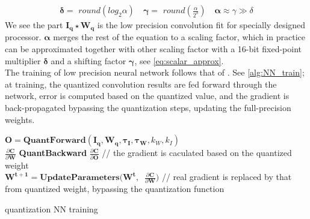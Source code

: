 \begin{equation}
    \begin{aligned}\label{eq:scalar_approx}
        \boldsymbol{\delta}=\textit{ round} ( log_2\alpha)\quad
        \boldsymbol{\gamma}=\textit{ round}( \frac{\alpha}{2^{\delta}})\quad
        \boldsymbol{\alpha}\approx\gamma\gg\delta
    \end{aligned}    
\end{equation}
We see the part $\boldsymbol{I_q}\star\boldsymbol{W_q}$ is the low precision convolution fit for specially designed processor. $\boldsymbol{\alpha}$ merges the rest of the equation to a scaling factor, which in practice can be approximated together with other scaling factor with a 16-bit fixed-point multiplier $\boldsymbol{\delta}$ and a shifting factor $\boldsymbol{\gamma}$, see \autoref{eq:scalar_approx}. \\
The training of low precision neural network follows that of \cite{XnorNet}. See \autoref{alg:NN_train}; at training, the quantized convolution results are fed forward through the network, error is computed based on the quantized value, and the gradient is back-propagated bypassing the quantization steps, updating the full-precision weights.
\begin{algorithm}
    \SetAlgoLined
        $\boldsymbol{O}=\textbf{QuantForward}(\boldsymbol{I_q},\boldsymbol{W_q},\boldsymbol{\tau_I},\boldsymbol{\tau_W},k_W,k_I )$ \\
        $\frac{\partial \boldsymbol{C} }{\partial \boldsymbol{W}}$
        \text{=\ }\textbf{QuantBackward}\text{(\ }  $\frac{\partial\boldsymbol{C}}{\partial\boldsymbol{O}}$
        // the gradient is caculated based on the quantized weight \\
        $\boldsymbol{W^{t+1}}=\textbf{UpdateParameters}(\boldsymbol{W^t},\ $ $\frac{\partial\boldsymbol{C}}{\partial\boldsymbol{W}})$ 
        // real gradient is replaced by that from quantized weight, bypassing the quantization function
    \caption{quantization NN training}
    \label{alg:NN_train}
\end{algorithm}

